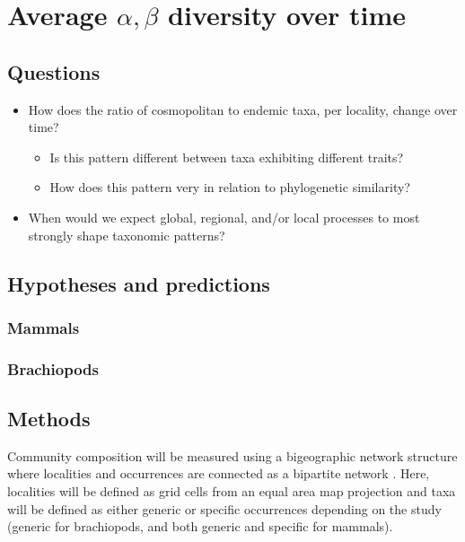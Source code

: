 \documentclass[12pt,letterpaper]{article}
\begin{document}


\section{Average \(\alpha, \beta\) diversity over time}
\subsection{Questions}
\begin{itemize}
  \item How does the ratio of cosmopolitan to endemic taxa, per locality, change over time?
    \begin{itemize}
      \item Is this pattern different between taxa exhibiting different traits?
      \item How does this pattern very in relation to phylogenetic similarity?
    \end{itemize}
  \item When would we expect global, regional, and/or local processes to most strongly shape taxonomic patterns?
\end{itemize}

\subsection{Hypotheses and predictions}
\subsubsection{Mammals}
\subsubsection{Brachiopods}

\subsection{Methods}
Community composition will be measured using a bigeographic network structure where localities and occurrences are connected as a bipartite network \citep{Sidor2013,Vilhena2013,Vilhena2013b}. Here, localities will be defined as grid cells from an equal area map projection and taxa will be defined as either generic or specific occurrences depending on the study (generic for brachiopods, and both generic and specific for mammals). 
\end{document}
